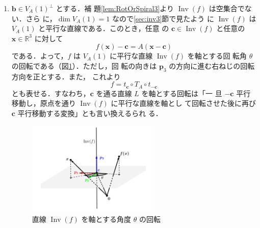 \documentclass[11pt, uplatex, dvipdfmx, titlepage]{jsarticle}
\makeatletter
\DeclareMathOperator{\Inv}{Inv}
\renewenvironment{proof}[1][\proofname]{\par
  \pushQED{\qed}%
  \normalfont \topsep6\p@\@plus6\p@\relax
  \trivlist
  \item[\hskip\labelsep
         \bfseries
    {#1}]\ignorespaces
}{%
  \popQED\endtrivlist\@endpefalse
}
\theoremstyle{definition}
\renewcommand{\proofname}{\textbf{証明}}
\makeatother
\begin{document}
\begin{proof}[定理\ref{thm:RotOrSpiral3}の証明]

  \begin{enumerate}[(1)]
  \item $\bm{b} \in V_A(1)^{\perp}$ とする．補
    題\ref{lem:RotOrSpiral3}より $\Inv(f)$ は空集合でない．さら
    に，$\dim V_A(1)=1$ なので\ref{sec:inv3}節で見たよう
    に $\Inv(f)$ は $V_A(1)$ と平行な直線である．このとき，任意
    の $\bm{c} \in \Inv(f)$ と任意の $\bm{x} \in \mathbb{R}^3$ に対して
    \[
      f(\bm{x}) - \bm{c} = A(\bm{x}-\bm{c})
    \]
    である．よって，$f$ は $V_A(1)$ に平行な直線 $\Inv(f)$ を軸とする回
    転角 $\theta$ の回転である（図\ref{fig:rotation3gen}）．ただし，回
    転の向きは $\bm{p}_3$ の方向に進む右ねじの回転方向を正とする．また，
    これより
    \[
      f= t_{\bm{c}} \circ T_A \circ t_{-\bm{c}} 
    \]
    とも表せる．すなわち，$\bm{c}$ を通る直線 $L$ を軸とする回転は「一
    旦 $-\bm{c}$ 平行移動し，原点を通り $\Inv(f)$ に平行な直線を軸とし
    て回転させた後に再び $\bm{c}$ 平行移動する変換」とも言い換えるられ
    る．
    \begin{figure}[h]
      \centering
      \includegraphics[height=4.5cm]{pictures/rotation3gen.pdf}
           \caption{直線 $\Inv(f)$ を軸とする角度 $\theta$ の回転}
      \label{fig:rotation3gen}
    \end{figure}


\end{enumerate}
\end{proof}
\end{document}

